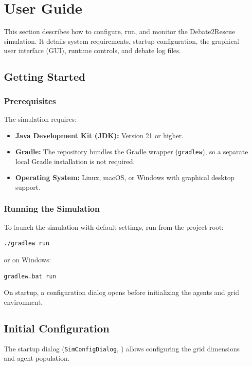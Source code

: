 \section{User Guide}
\label{sec:user_guide}

This section describes how to configure, run, and monitor the Debate2Rescue simulation.
It details system requirements, startup configuration, the graphical user interface (GUI), runtime controls, and debate log files.

\subsection{Getting Started}
\label{subsec:getting_started}

\subsubsection{Prerequisites}
The simulation requires:
\begin{itemize}
    \item \textbf{Java Development Kit (JDK):} Version 21 or higher.
    \item \textbf{Gradle:} The repository bundles the Gradle wrapper (\texttt{gradlew}), so a separate local Gradle installation is not required.
    \item \textbf{Operating System:} Linux, macOS, or Windows with graphical desktop support.
\end{itemize}

\subsubsection{Running the Simulation}
To launch the simulation with default settings, run from the project root:
\begin{verbatim}
./gradlew run
\end{verbatim}
or on Windows:
\begin{verbatim}
gradlew.bat run
\end{verbatim}

On startup, a configuration dialog opens before initializing the agents and grid environment.

\subsection{Initial Configuration}
\label{subsec:initial_config}

The startup dialog (\texttt{SimConfigDialog}, ) allows configuring the grid dimensions and agent population.

